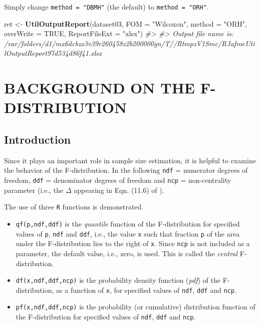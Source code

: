 \documentclass[
]{book}
\newenvironment{Shaded}{\begin{snugshade}}{\end{snugshade}}
\newcommand{\CommentTok}[1]{\textcolor[rgb]{0.56,0.35,0.01}{\textit{#1}}}
\newcommand{\DataTypeTok}[1]{\textcolor[rgb]{0.13,0.29,0.53}{#1}}
\newcommand{\KeywordTok}[1]{\textcolor[rgb]{0.13,0.29,0.53}{\textbf{#1}}}
\newcommand{\NormalTok}[1]{#1}
\newcommand{\OtherTok}[1]{\textcolor[rgb]{0.56,0.35,0.01}{#1}}
\newcommand{\StringTok}[1]{\textcolor[rgb]{0.31,0.60,0.02}{#1}}
\begin{document}
Simply change \texttt{method\ =\ "DBMH"} (the default) to \texttt{method\ =\ "ORH"}.

\begin{Shaded}
\begin{Highlighting}[]
\NormalTok{ret \textless{}{-}}\StringTok{ }\KeywordTok{UtilOutputReport}\NormalTok{(dataset03, }\DataTypeTok{FOM =} \StringTok{"Wilcoxon"}\NormalTok{, }\DataTypeTok{method =} \StringTok{"ORH"}\NormalTok{, }\DataTypeTok{overWrite =} \OtherTok{TRUE}\NormalTok{, }\DataTypeTok{ReportFileExt =} \StringTok{"xlsx"}\NormalTok{)}
\CommentTok{\#\textgreater{} }
\CommentTok{\#\textgreater{} Output file name is:      /var/folders/d1/mx6dcbzx3v39r260458z2b200000gn/T//RtmpzV1Smc/RJafrocUtilOutputReport97d534d86f41.xlsx}
\end{Highlighting}
\end{Shaded}

\hypertarget{SSFDistr}{%
\chapter{BACKGROUND ON THE F-DISTRIBUTION}\label{SSFDistr}}

\hypertarget{introduction-7}{%
\section{Introduction}\label{introduction-7}}

Since it plays an important role in sample size estimation, it is helpful to examine the behavior of the F-distribution. In the following \texttt{ndf} = numerator degrees of freedom, \texttt{ddf} = denominator degrees of freedom and \texttt{ncp} = non-centrality parameter (i.e., the \(\Delta\) appearing in Eqn. (11.6) of \citep{RN2680}).

The use of three \texttt{R} functions is demonstrated.

\begin{itemize}
\item
  \texttt{qf(p,ndf,ddf)} is the \emph{quantile} function of the F-distribution for specified values of \texttt{p}, \texttt{ndf} and \texttt{ddf}, i.e., the value \texttt{x} such that fraction \texttt{p} of the area under the F-distribution lies to the right of \texttt{x}. Since \texttt{ncp} is not included as a parameter, the default value, i.e., zero, is used. This is called the \emph{central} F-distribution.
\item
  \texttt{df(x,ndf,ddf,ncp)} is the probability density function (\emph{pdf}) of the F-distribution, as a function of \texttt{x}, for specified values of \texttt{ndf}, \texttt{ddf} and \texttt{ncp}.
\item
  \texttt{pf(x,ndf,ddf,ncp)} is the probability (or cumulative) distribution function of the F-distribution for specified values of \texttt{ndf}, \texttt{ddf} and \texttt{ncp}.
\end{itemize}
\end{document}
